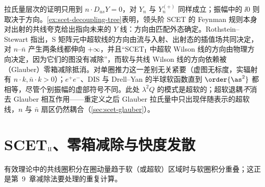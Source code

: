\begin{remark}[$Y_n$ 的方向与 $\ii0$]\label{rem:scet-y-direction}
拉氏量层次的证明只用到 $n\cdot D_{us}Y=0$，对 $Y_n$ 与 $Y_n^{(+)}$ 同样成立；振幅中的 $\ii0$ 则取决于方向。\cref{ex:scet-decoupling-tree}表明，领头阶 SCET 的 Feynman 规则本身对出射的共线夸克给出指向未来的 $Y$ 线\cite{Chay:2004zn}：方向由匹配外态确定。Rothstein--Stewart 指出，S 矩阵元中超软线的方向由流与入射、出射态的插值场共同决定，对 $n$–$\bar n$ 产生两条线都伸向 $+\infty$\cite[第~10.1~节]{RothsteinStewart2016}，并且“SCET$_{\rm I}$ 中超软 Wilson 线的方向由物理方向决定，因为它们的图没有减除”，而软与共线 Wilson 线的方向依赖被（Glauber）零箱减除抵消\cite[第~4.2~节]{RothsteinStewart2016}。对单圈推力这一差别无关紧要（虚图无标度，实辐射有 $n\cdot k,\bar n\cdot k>0$）；$e^+e^-$、DIS 与 Drell--Yan 的半球软函数直到 $\order{\as^2}$ 都相等，尽管个别振幅的虚部符号不同\cite{Kang:2015moa}。此处 $\lambda^2Q$ 的模式是超软的；超软退耦\emph{不}消去 Glauber 相互作用——重定义之后 Glauber 拉氏量中只出现伴随表示的超软线，$n$ 与 $\bar n$ 扇区仍然耦合\cite[第~5.1~节]{RothsteinStewart2016}（\cref{sec:scet-glauber}）。
\end{remark}

\section{SCET\texorpdfstring{$_{\rm II}$}{II}、零箱减除与快度发散}\label{sec:scet-scet2}

有效理论中的共线圈积分在圈动量趋于软（或超软）区域时与软圈积分重叠；这正是第~9~章减除法要处理的重复计算。

